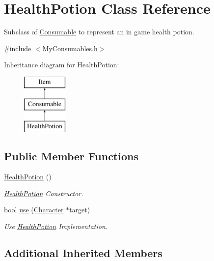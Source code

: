 \hypertarget{classHealthPotion}{\section{Health\-Potion Class Reference}
\label{classHealthPotion}
}


Subclass of \hyperlink{classConsumable}{Consumable} to represent an in game health potion.  




{\ttfamily \#include $<$My\-Consumables.\-h$>$}

Inheritance diagram for Health\-Potion\-:\begin{figure}[H]
\begin{center}
\leavevmode
\includegraphics[height=3.000000cm]{classHealthPotion}
\end{center}
\end{figure}
\subsection*{Public Member Functions}
\begin{DoxyCompactItemize}
\item 
\hyperlink{classHealthPotion_a99e942956f7f1e07dd13c46daae08713}{Health\-Potion} ()
\begin{DoxyCompactList}\small\item\em \hyperlink{classHealthPotion}{Health\-Potion} Constructor. \end{DoxyCompactList}\item 
bool \hyperlink{classHealthPotion_a5e1fc49fe1d5440f56baddfe219c31fe}{use} (\hyperlink{classCharacter}{Character} $\ast$target)
\begin{DoxyCompactList}\small\item\em Use \hyperlink{classHealthPotion}{Health\-Potion} Implementation. \end{DoxyCompactList}\end{DoxyCompactItemize}
\subsection*{Additional Inherited Members}


